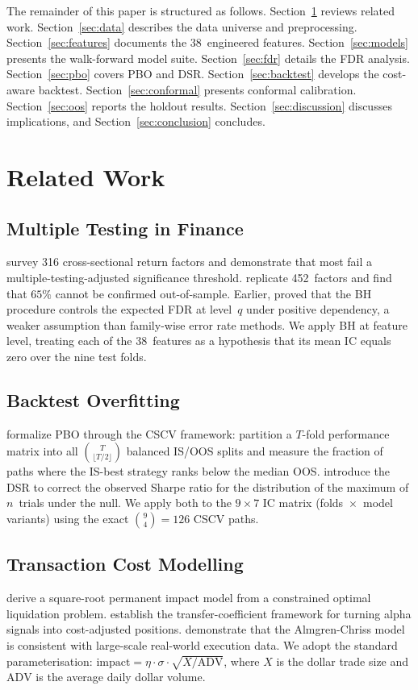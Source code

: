 \documentclass[journal]{IEEEtran}
\newcommand{\ADV}{\mathrm{ADV}}
\begin{document}
The remainder of this paper is structured as follows.
Section~\ref{sec:related} reviews related work.
Section~\ref{sec:data} describes the data universe and preprocessing.
Section~\ref{sec:features} documents the 38~engineered features.
Section~\ref{sec:models} presents the walk-forward model suite.
Section~\ref{sec:fdr} details the FDR analysis.
Section~\ref{sec:pbo} covers PBO and DSR.
Section~\ref{sec:backtest} develops the cost-aware backtest.
Section~\ref{sec:conformal} presents conformal calibration.
Section~\ref{sec:oos} reports the holdout results.
Section~\ref{sec:discussion} discusses implications, and
Section~\ref{sec:conclusion} concludes.

\section{Related Work}
\label{sec:related}

\subsection{Multiple Testing in Finance}
\citet{harvey2016and} survey 316 cross-sectional return factors and
demonstrate that most fail a multiple-testing-adjusted significance
threshold.
\citet{hou2020replicating} replicate 452~factors and find that
$65\%$ cannot be confirmed out-of-sample.
Earlier, \citet{bh1995} proved that the BH procedure controls the
expected FDR at level~$q$ under positive dependency, a weaker
assumption than family-wise error rate methods.
We apply BH at feature level, treating each of the 38~features as a
hypothesis that its mean IC equals zero over the nine test folds.

\subsection{Backtest Overfitting}
\citet{bailey2015probability} formalize PBO through the CSCV
framework: partition a $T$-fold performance matrix into all
$\binom{T}{\lfloor T/2\rfloor}$ balanced IS/OOS splits and measure
the fraction of paths where the IS-best strategy ranks below the
median OOS.
\citet{bailey2014deflated} introduce the DSR to correct the observed
Sharpe ratio for the distribution of the maximum of $n$~trials under
the null.
We apply both to the $9\times7$ IC matrix (folds~$\times$~model
variants) using the exact $\binom{9}{4}=126$ CSCV paths.

\subsection{Transaction Cost Modelling}
\citet{almgren2001optimal} derive a square-root permanent impact model
from a constrained optimal liquidation problem.
\citet{grinold2000active} establish the transfer-coefficient
framework for turning alpha signals into cost-adjusted positions.
\citet{frazzini2018trading} demonstrate that the Almgren-Chriss
model is consistent with large-scale real-world execution data.
We adopt the standard parameterisation:
$\text{impact} = \eta \cdot \sigma \cdot \sqrt{X/\ADV}$,
where $X$ is the dollar trade size and $\ADV$ is the average daily
dollar volume.
\end{document}
